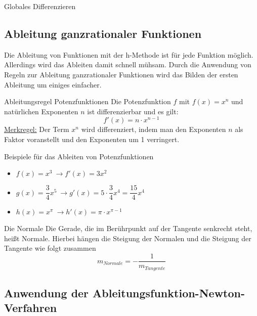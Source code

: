 \begin{section}{Globales Differenzieren}
\subsection{Ableitung ganzrationaler Funktionen}
Die Ableitung von Funktionen mit der h-Methode ist für jede Funktion möglich. Allerdings wird das Ableiten damit schnell mühsam. Durch die Anwendung von Regeln zur Ableitung ganzrationaler Funktionen wird das Bilden der ersten Ableitung um einiges einfacher.\\
\begin{merke*}{Ableitungsregel Potenzfunktionen}{}
Die Potenzfunktion $f$ mit $f(x) = x^n$ und natürlichen Exponenten $n$ ist differenzierbar und es gilt: $$f'(x) = n\cdot x^{n-1}$$
\underline{Merkregel:} Der Term $x^n$ wird differenziert, indem man den Exponenten $n$ als Faktor voranstellt und den Exponenten um 1 verringert.
\end{merke*}
\begin{bsp}{Beispiele für das Ableiten von Potenzfunktionen}{}
\begin{itemize}
    \item $f(x)= x^3\ \longrightarrow f'(x) = 3x^2$
    \item $g(x) = \dfrac{3}{4} x^5 \ \longrightarrow g'(x)=  5\cdot \dfrac{3}{4} x^4 = \dfrac{15}{4}x^4$ 
    \item $h(x) = x^{\pi} \ \longrightarrow h'(x) = \pi \cdot x^{\pi -1}$
\end{itemize}
\end{bsp} 
\begin{defi}{Die Normale}{}
    Die Gerade, die im Berührpunkt auf der Tangente senkrecht steht, heißt Normale. Hierbei hängen die Steigung der Normalen und die Steigung der Tangente wie folgt zusammen $$m_{Normale} = -\dfrac{1}{m_{Tangente}}$$
\end{defi}

\subsection{Anwendung der Ableitungsfunktion-Newton-Verfahren}


\end{section}

